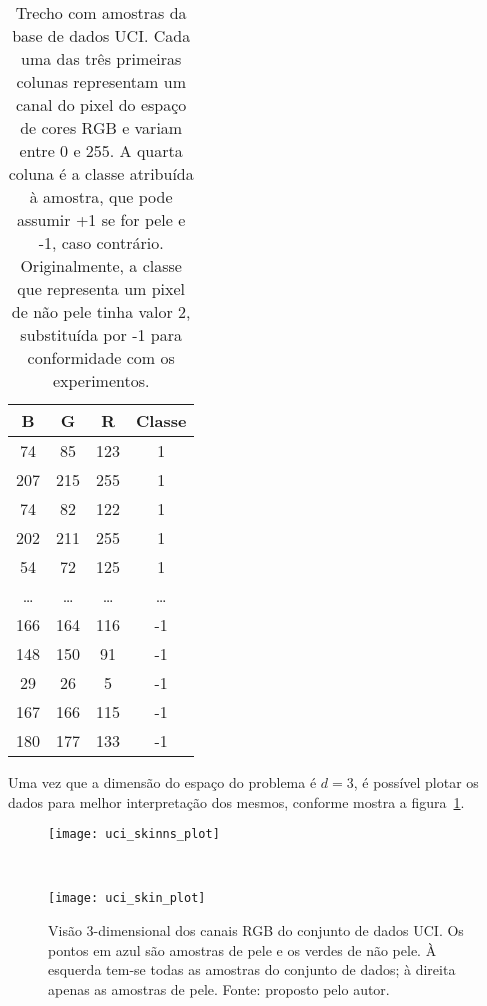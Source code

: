 \begin{table}[!htpb]
\centering
\begin{small}
\begin{tabular}{|c|c|c|c|} \hline
B       & G     & R     & Classe  \\ \hline
74	    & 85    & 123	& 1     \\
207	    & 215   & 255   & 1     \\
74      & 82    & 122	& 1     \\
202     & 211   & 255   & 1     \\
54      & 72    & 125   & 1     \\
\ldots  &\ldots & \dots &\ldots \\
166     & 164   & 116   & -1    \\
148     & 150   & 91    & -1    \\
29      & 26    & 5     & -1    \\
167     & 166	& 115	& -1    \\
180	    & 177	& 133	& -1    \\ \hline
\end{tabular}
\caption[Trecho com amostras da base de dados UCI]{Trecho com amostras da base de dados UCI. Cada uma das três primeiras colunas representam um canal do pixel do espaço de cores RGB e variam entre 0 e 255. A quarta coluna é a classe atribuída à amostra, que pode assumir +1 se for pele e -1, caso contrário. Originalmente, a classe que representa um pixel de não pele tinha valor 2, substituída por -1 para conformidade com os experimentos.}
\label{tbl:uci_dataset}
\end{small}
\end{table}

Uma vez que a dimensão do espaço do problema é $d = 3$, é possível plotar os dados para melhor interpretação dos mesmos, conforme mostra a figura~\ref{fig:dataset_uci}.
\begin{figure}[h]
    \centering
    \begin{minipage}{0.45\textwidth}
        \texttt{[image: uci\_skinns\_plot]}
    \end{minipage}
    ~ %
    \begin{minipage}{0.45\textwidth}
        \texttt{[image: uci\_skin\_plot]}
    \end{minipage}
    \caption[Visão 3-dimensional dos canais RGB do conjunto de dados UCI]{Visão 3-dimensional dos canais RGB do conjunto de dados UCI. Os pontos em azul são amostras de pele e os verdes de não pele. À esquerda tem-se todas as amostras do conjunto de dados; à direita apenas as amostras de pele. Fonte: proposto pelo autor.}
    \label{fig:dataset_uci}
\end{figure}

